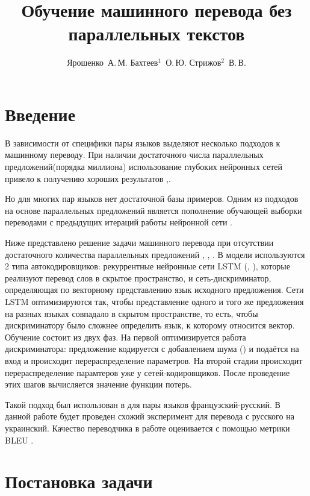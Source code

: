 \documentclass[12pt,twoside]{article}
\title
    [Обучение машинного перевода без параллельных текстов] %
    {Обучение машинного перевода без параллельных текстов}
\author
    [Ярошенко~А.\,М. Бахтеев$^1$~О.\,Ю.  Стрижов$^2$~В.\,В.] %
{Ярошенко~А.\,М. Бахтеев$^1$~О.\,Ю.  Стрижов$^2$~В.\,В.} %
[Ярошенко~А.\,М. Бахтеев$^1$~О.\,Ю.  Стрижов$^2$~В.\,В.] %
\begin{document}
\maketitle

\section{Введение}

В зависимости от специфики пары языков выделяют несколько подходов к машинному переводу. При наличии достаточного числа параллельных предложений(порядка миллиона) использование глубоких нейронных сетей привело к получению хороших результатов \cite{zou2013bilingual},\cite{cho2014properties}. 

Но для многих пар языков нет достаточной базы примеров. Одним из подходов на основе параллельных предложений является пополнение обучающей выборки переводами с предыдущих итераций работы нейронной сети \cite{bertoldi2009domain}. 

Ниже представлено решение задачи машинного перевода при отсутствии достаточного количества параллельных предложений \cite{wu2016google}, \cite{sutskever2014sequence}, \cite{bahdanau2014neural}. В модели используются 2 типа автокодировщиков: рекуррентные нейронные сети LSTM (\cite{gers1999learning}, \cite{graves2005framewise}), которые реализуют перевод слов в скрытое пространство, и сеть-дискриминатор, определяющая по векторному представлению язык исходного предложения. Сети LSTM оптимизируются так, чтобы представление одного и того же предложения на разных языках совпадало в скрытом пространстве, то есть, чтобы дискриминатору было сложнее определить язык, к которому относится вектор. Обучение состоит из двух фаз. На первой оптимизируется работа дискриминатора: предложение кодируется с добавлением шума (\cite{kimimproving}) и подаётся на вход и происходит перераспределение параметров. На второй стадии происходит перераспределение парамтеров уже у сетей-кодировщиков. После проведение этих шагов вычисляется значение функции потерь. 
 
Такой подход был использован в \cite{lample2017unsupervised} для пары языков французский-русский. В данной работе будет проведен схожий эксперимент для перевода с русского на украинский. Качество переводчика в работе оценивается с помощью метрики BLEU \cite{papineni2002bleu}.

\section{Постановка задачи}
\end{document}
